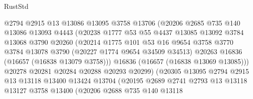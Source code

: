 \begin{lexlean}{RustStd}
\begin{coremodule}
                          @2794
                          @2915
                          @13
                          @13086
                          @13095
                          @3758
                          @13706
                          (@20206
                            @2685
                            @735
                            @140
                            @13086
                            @13093
                            @4443
                            (@20238
                              @1777
                              @53
                              @55
                              @4437
                              @13085
                              @13092
                              @3784
                              @13068
                              @3790
                              @20260
                              (@20214
                                @1775
                                @101
                                @53
                                @16
                                @9654
                                @3758
                                @3770
                                @3784
                                @13078
                                @3790
                                (@20227 @1774 @9654 @34509 @34513)
                                @20263
                                @16836
                                (@16657 (@16838 @13079 @3758)))
                              @16836
                              (@16657 (@16838 @13069 @13085)))
                            @20278
                            @20281
                            @20284
                            @20288
                            @20293
                            @20299)
                          (@20305
                            @13095
                            @2794
                            @2915
                            @13
                            @13118
                            @13400
                            @13424
                            @13704
                            (@20195
                              @2689
                              @2741
                              @2793
                              @13
                              @13118
                              @13127
                              @3758
                              @13400
                              (@20206
                                @2688
                                @735
                                @140
                                @13118

\end{coremodule}
\end{lexlean}
